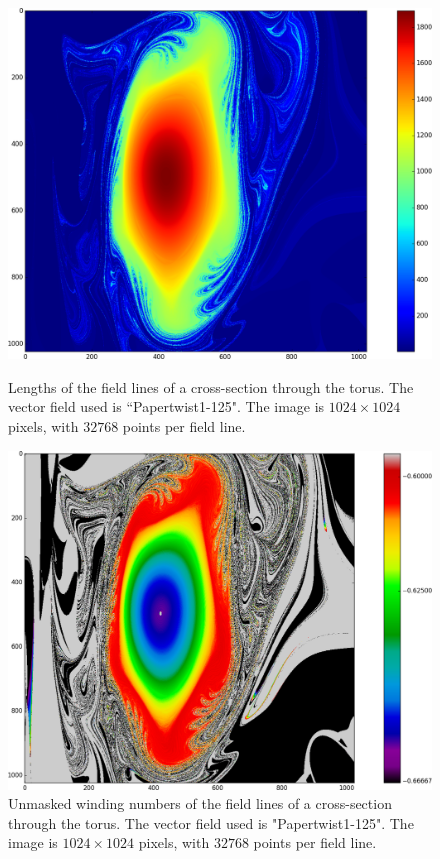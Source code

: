 \documentclass{article}
\begin{document}
\begin{figure}[!htb]
  \includegraphics[width=\linewidth]{Figures/Rings_Papertwist_twist1_125_lengths_steps32k.png}
  \caption{Lengths of the field lines of a cross-section through the torus. The vector field used is ``Papertwist1-125". The image is $1024\times 1024$ pixels, with $32768$ points per field line.}\label{fig:125-lengths}
\endminipage\hfill
{}
  \includegraphics[width=\linewidth]{Figures/Rings_Papertwist_twist1_125_nomask_steps32k.png}
  \caption{Unmasked winding numbers of the field lines of a cross-section through the torus. The vector field used is "Papertwist1-125". The image is $1024\times 1024$ pixels, with $32768$ points per field line.}\label{fig:125-unmasked}
\endminipage
\end{figure}
\end{document}
